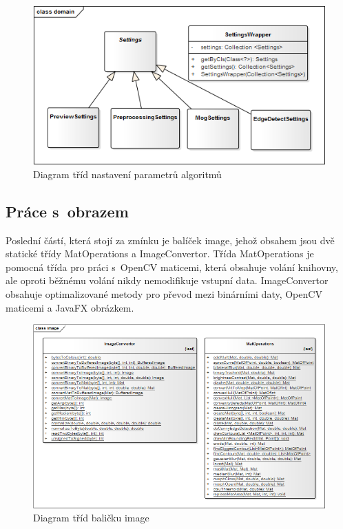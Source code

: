     \begin{figure}[h]
      \centering
      \includegraphics[width=1\textwidth]{images/ea_class_settings.png}
      \caption{Diagram tříd nastavení parametrů algoritmů}
      \label{fig:ea_settings}
    \end{figure} 

	\subsection{Práce s~obrazem}
    Poslední částí, která stojí za zmínku je balíček image, jehož obsahem jsou dvě statické třídy MatOperations a ImageConvertor. Třída MatOperations je pomocná třída pro práci s~OpenCV maticemi, která obsahuje volání knihovny, ale oproti běžnému volání nikdy nemodifikuje vstupní data. ImageConvertor obsahuje optimalizované metody pro převod mezi binárními daty, OpenCV maticemi a JavaFX obrázkem.

    \begin{figure}[h]
      \centering
      \includegraphics[width=1\textwidth]{images/ea_class_image.png}
      \caption{Diagram tříd baličku image}
      \label{fig:flir_binary_viewer}
    \end{figure} 


